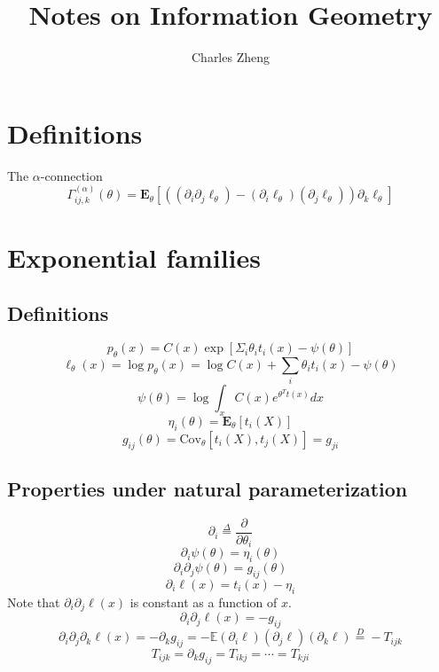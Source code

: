\documentclass[11pt]{article}
\begin{document}
\newcommand{\tr}{\text{tr}}
\newcommand{\E}{\textbf{E}}
\newcommand{\diag}{\text{diag}}
\newcommand{\argmax}{\text{argmax}}
\newcommand{\argmin}{\text{argmin}}
\newcommand{\Cov}{\text{Cov}}
\newcommand{\Vol}{\text{Vol}}

\title{Notes on Information Geometry}

\author{Charles Zheng}


\maketitle



\section{Definitions}

The $\alpha$-connection
\[
\Gamma^{(\alpha)}_{ij, k}(\theta) = \E_\theta[((\partial_i\partial_j \ell_\theta) - (\partial_i \ell_\theta)(\partial_j \ell_\theta)) \partial_k \ell_\theta]
\]

\section{Exponential families}       

\subsection{Definitions}
\[
p_\theta(x) = C(x) \exp[\Sigma_i \theta_i t_i(x) - \psi(\theta)]
\]
\[
\ell_\theta(x) = \log p_\theta(x) = \log C(x) + \sum_i \theta_i t_i(x) - \psi(\theta)
\]
\[
\psi(\theta) = \log \int_x C(x) e^{\theta^T t(x)} dx
\]
\[
\eta_i(\theta) = \E_\theta[t_i(X)]
\]
\[
g_{ij}(\theta) = \Cov_\theta[t_i(X), t_j(X)] = g_{ji}
\]

\subsection{Properties under natural parameterization}
\[
\partial_i \stackrel{\Delta}{=} \frac{\partial}{\partial \theta_i}
\]
\[
\partial_i \psi(\theta) = \eta_i(\theta)
\]
\[
\partial_i \partial_j \psi(\theta) = g_{ij}(\theta)
\]
\[
\partial_i \ell(x) = t_i(x) - \eta_i
\]
Note that $\partial_i \partial_j \ell(x)$ is constant as a function of $x$.
\[
\partial_i \partial_j \ell(x) = -g_{ij}
\]
\[
\partial_i \partial_j \partial_k \ell(x) = -\partial_k g_{ij} = -\mathbb{E}(\partial_i \ell)(\partial_j \ell)(\partial_k \ell) \stackrel{D}{=} - T_{ijk}
\]
\[
T_{ijk} = \partial_k g_{ij}  = T_{ikj} = \cdots = T_{kji}
\]
\end{document}
